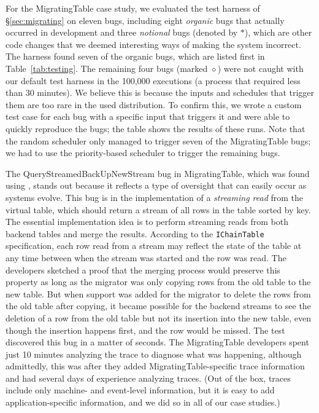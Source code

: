 For the MigratingTable case study, we evaluated the \psharp test harness of \S\ref{sec:migrating} on eleven bugs, including eight \emph{organic} bugs that actually occurred in development and three \emph{notional} bugs (denoted by $*$), which are other code changes that we deemed interesting ways of making the system incorrect. The harness found seven of the organic bugs, which are listed first in Table~\ref{tab:testing}. The remaining four bugs (marked $\diamond$) were not caught with our default test harness in the 100,000 executions (a process that required less than 30 minutes). We believe this is because the inputs and schedules that trigger them are too rare in the used distribution. To confirm this, we wrote a custom test case for each bug with a specific input that triggers it and were able to quickly reproduce the bugs;
the table shows the results of these runs.
Note that the random scheduler only managed to trigger seven of the MigratingTable bugs; we had to use the priority-based scheduler to trigger the remaining bugs.

The QueryStreamedBackUpNewStream bug in MigratingTable, which was found using \psharp, stands out because it reflects a type of oversight that can easily occur as systems evolve. This bug is in the implementation of a \emph{streaming read} from the virtual table, which should return a stream of all rows in the table sorted by key. The essential implementation idea is to perform streaming reads from both backend tables and merge the results. According to the \texttt{IChainTable} specification, each row read from a stream may reflect the state of the table at any time between when the stream was started and the row was read. The developers sketched a proof that the merging process would preserve this property as long as the migrator was only copying rows from the old table to the new table. But when support was added for the migrator to delete the rows from the old table after copying, it became possible for the backend streams to see the deletion of a row from the old table but not its insertion into the new table, even though the insertion happens first, and the row would be missed. The \psharp test discovered this bug in a matter of seconds. The MigratingTable developers spent just 10 minutes analyzing the trace to diagnose what was happening, although admittedly, this was after they added MigratingTable-specific trace information and had several days of experience analyzing traces. (Out of the box, \psharp traces include only machine- and event-level information, but it is easy to add application-specific information, and we did so in all of our case studies.)

